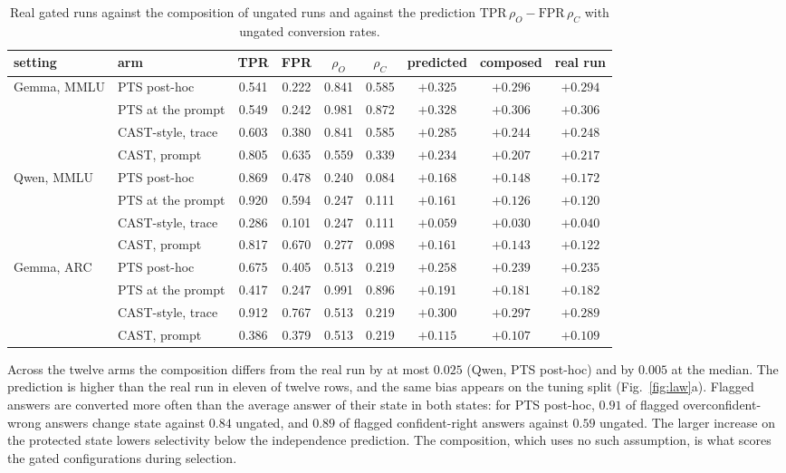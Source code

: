 \begin{table}[h]\footnotesize\setlength{\tabcolsep}{4pt}
\centering
\begin{tabular}{ll|cc|cc|ccc}
\hline
setting & arm & TPR & FPR & $\rho_O$ & $\rho_C$ & predicted & composed & real run \\
\hline
\multirow{4}{*}{Gemma, MMLU} & PTS post-hoc & 0.541 & 0.222 & 0.841 & 0.585 & $+0.325$ & $+0.296$ & $+0.294$ \\
 & PTS at the prompt & 0.549 & 0.242 & 0.981 & 0.872 & $+0.328$ & $+0.306$ & $+0.306$ \\
 & CAST-style, trace & 0.603 & 0.380 & 0.841 & 0.585 & $+0.285$ & $+0.244$ & $+0.248$ \\
 & CAST, prompt & 0.805 & 0.635 & 0.559 & 0.339 & $+0.234$ & $+0.207$ & $+0.217$ \\
\hline
\multirow{4}{*}{Qwen, MMLU} & PTS post-hoc & 0.869 & 0.478 & 0.240 & 0.084 & $+0.168$ & $+0.148$ & $+0.172$ \\
 & PTS at the prompt & 0.920 & 0.594 & 0.247 & 0.111 & $+0.161$ & $+0.126$ & $+0.120$ \\
 & CAST-style, trace & 0.286 & 0.101 & 0.247 & 0.111 & $+0.059$ & $+0.030$ & $+0.040$ \\
 & CAST, prompt & 0.817 & 0.670 & 0.277 & 0.098 & $+0.161$ & $+0.143$ & $+0.122$ \\
\hline
\multirow{4}{*}{Gemma, ARC} & PTS post-hoc & 0.675 & 0.405 & 0.513 & 0.219 & $+0.258$ & $+0.239$ & $+0.235$ \\
 & PTS at the prompt & 0.417 & 0.247 & 0.991 & 0.896 & $+0.191$ & $+0.181$ & $+0.182$ \\
 & CAST-style, trace & 0.912 & 0.767 & 0.513 & 0.219 & $+0.300$ & $+0.297$ & $+0.289$ \\
 & CAST, prompt & 0.386 & 0.379 & 0.513 & 0.219 & $+0.115$ & $+0.107$ & $+0.109$ \\
\hline
\end{tabular}
\caption{Real gated runs against the composition of ungated runs and against
the prediction $\mathrm{TPR}\,\rho_O-\mathrm{FPR}\,\rho_C$ with ungated
conversion rates.}
\label{tab:law-confirm}
\end{table}

Across the twelve arms the composition differs from the real run by at most
$0.025$ (Qwen, PTS post-hoc) and by $0.005$ at the median. The prediction is higher
than the real run in eleven of twelve rows, and the same bias appears on the
tuning split (Fig.~\ref{fig:law}a).
Flagged answers are converted more often than the average answer of their state
in both states: for PTS post-hoc, $0.91$ of flagged overconfident-wrong answers
change state against $0.84$ ungated, and $0.89$ of flagged confident-right
answers against $0.59$ ungated. The larger increase on the protected state
lowers selectivity below the independence prediction. The composition, which
uses no such assumption, is what scores the gated configurations during
selection.


